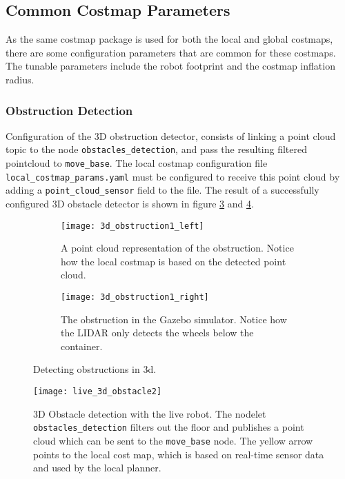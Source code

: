\subsection{Common Costmap Parameters}

As the same costmap package is used for both the local and global costmaps, there are some configuration parameters that are common for these costmaps. The tunable parameters include the robot footprint and the costmap inflation radius. 

\subsubsection{Obstruction Detection}

Configuration of the 3D obstruction detector, consists of linking a point cloud topic to the node \texttt{obstacles\_detection}, and pass the resulting filtered pointcloud to \texttt{move\_base}. The local costmap configuration file \texttt{local\_costmap\_params.yaml} must be configured to receive this point cloud by adding a \texttt{point\_cloud\_sensor} field to the file. The result of a successfully configured 3D obstacle detector is shown in figure \ref{fig:3d_obstruction1} and \ref{fig:live_3d_obstacle2}.

\begin{figure}
	\centering
	\begin{subfigure}[b]{0.53\textwidth}
		\texttt{[image: 3d\_obstruction1\_left]}
		\caption{A point cloud representation of the obstruction. Notice how the local costmap is based on the detected point cloud.}
		\label{fig:3d_obstruction1_left}
	\end{subfigure}
		\begin{subfigure}[b]{0.45\textwidth}
			\texttt{[image: 3d\_obstruction1\_right]}
			\caption{The obstruction in the Gazebo simulator. Notice how the LIDAR only detects the wheels below the container.}
			\label{fig:3d_obstruction1_right}
		\end{subfigure}
	\caption{\label{fig:3d_obstruction1}Detecting obstructions in 3d.}
\end{figure}

\begin{figure}[h]
	\centering
	\texttt{[image: live\_3d\_obstacle2]}
	\caption{3D Obstacle detection with the live robot. The nodelet \texttt{obstacles\_detection} filters out the floor and publishes a point cloud which can be sent to the \texttt{move\_base} node. The yellow arrow points to the local cost map, which is based on real-time sensor data and used by the local planner.}
	\label{fig:live_3d_obstacle2}
\end{figure}